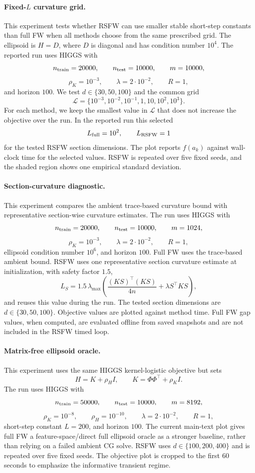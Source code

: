 \documentclass{article}
\begin{document}
\paragraph{Fixed-\(L\) curvature grid.}
This experiment tests whether RSFW can use smaller stable short-step constants
than full FW when all methods choose from the same prescribed grid. The
ellipsoid is \(H=D\), where \(D\) is diagonal and has condition number \(10^4\).
The reported run uses HIGGS with
\[
    n_{\rm train}=20000,\qquad n_{\rm test}=10000,\qquad m=10000,
\]
\[
    \rho_K=10^{-3},\qquad \lambda=2\cdot10^{-2},\qquad R=1,
\]
and horizon \(100\). We test \(d\in\{30,50,100\}\) and the common grid
\[
    \mathcal L=\{10^{-3},10^{-2},10^{-1},1,10,10^2,10^3\}.
\]
For each method, we keep the smallest value in \(\mathcal L\) that does not
increase the objective over the run. In the reported run this selected
\[
    L_{\rm full}=10^2,\qquad L_{\rm RSFW}=1
\]
for the tested RSFW section dimensions. The plot reports \(f(a_k)\) against
wall-clock time for the selected values. RSFW is repeated over five fixed seeds,
and the shaded region shows one empirical standard deviation.

\paragraph{Section-curvature diagnostic.}
This experiment compares the ambient trace-based curvature bound with
representative section-wise curvature estimates. The run uses HIGGS with
\[
    n_{\rm train}=20000,\qquad n_{\rm test}=10000,\qquad m=1024,
\]
\[
    \rho_K=10^{-3},\qquad \lambda=2\cdot10^{-2},\qquad R=1,
\]
ellipsoid condition number \(10^6\), and horizon \(100\). Full FW uses the
trace-based ambient bound. RSFW uses one representative section curvature
estimate at initialization, with safety factor \(1.5\),
\[
    L_S
    =
    1.5\,
    \lambda_{\max}\!\left(
    \frac{(KS)^\top(KS)}{4n}+\lambda S^\top K S
    \right),
\]
and reuses this value during the run. The tested section dimensions are
\(d\in\{30,50,100\}\). Objective values are plotted against method time. Full FW
gap values, when computed, are evaluated offline from saved snapshots and are
not included in the RSFW timed loop.

\paragraph{Matrix-free ellipsoid oracle.}
This experiment uses the same HIGGS kernel-logistic objective but sets
\[
    H=K+\rho_H I,
    \qquad
    K=\Phi\Phi^\top+\rho_K I .
\]
The run uses HIGGS with
\[
    n_{\rm train}=50000,\qquad n_{\rm test}=10000,\qquad m=8192,
\]
\[
    \rho_K=10^{-8},\qquad \rho_H=10^{-10},\qquad
    \lambda=2\cdot10^{-2},\qquad R=1,
\]
short-step constant \(L=200\), and horizon \(100\). The current main-text plot
gives full FW a feature-space/direct full ellipsoid oracle as a stronger
baseline, rather than relying on a failed ambient CG solve. RSFW uses
\(d\in\{100,200,400\}\) and is repeated over five fixed seeds. The objective
plot is cropped to the first \(60\) seconds to emphasize the informative
transient regime.
\end{document}
